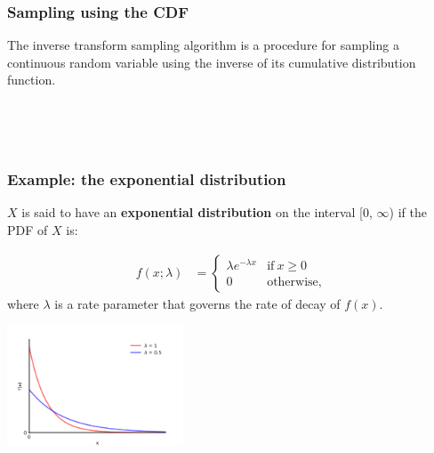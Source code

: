 \documentclass[10pt]{beamer}
\begin{document}
\begin{frame}
\frametitle{Sampling using the CDF}

The inverse transform sampling algorithm is a procedure for sampling a continuous random variable
using the inverse of its cumulative distribution function.

\


\ 


\end{frame}

\begin{frame}
\frametitle{Example: the exponential distribution}

\begin{definition}
$X$ is said to have an \textbf{exponential distribution} on the interval [0, $\infty$) if the PDF of $X$ is:

\vspace{-.5cm}

\begin{align*}
    f(x; \lambda) &= 
    \begin{cases}
      \lambda e ^{-\lambda x} & \text{if}\ x \geq 0 \\
      0 & \text{otherwise},
    \end{cases}
\end{align*}
where $\lambda$ is a rate parameter that governs the rate of decay of $f(x)$. 
\end{definition}

\center \includegraphics[height=3.6cm]{images/exp_pdf.png}

\end{frame}
\end{document}
